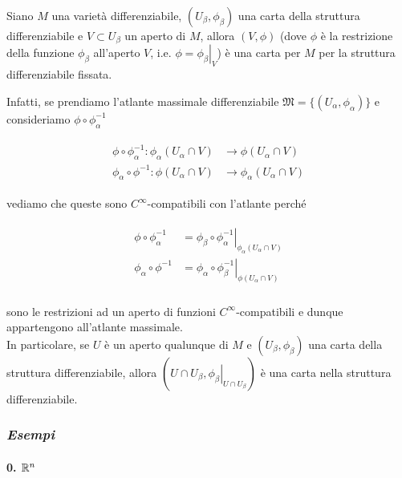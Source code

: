 \begin{remark}
	Siano $ M $ una varietà differenziabile, $ (U_{\beta},\phi_{\beta}) $ una carta della struttura differenziabile e $ V \subset U_{\beta} $ un aperto di $ M $, allora $ (V,\phi) $ (dove $ \phi $ è la restrizione della funzione $ \phi_{\beta} $ all'aperto $ V $, i.e. $ \phi = \left. \phi_{\beta} \right|_{V} $) è una carta per $ M $ per la struttura differenziabile fissata.
\end{remark}

Infatti, se prendiamo l'atlante massimale differenziabile $ \mathfrak{M} = \{(U_{\alpha},\phi_{\alpha})\} $ e consideriamo $ \phi \circ \phi_{\alpha}^{-1} $

\begin{align}
	\begin{split}
		\phi \circ \phi_{\alpha}^{-1} : \phi_{\alpha}(U_{\alpha} \cap V) &\to \phi(U_{\alpha} \cap V)\\
		\phi_{\alpha} \circ \phi^{-1} : \phi(U_{\alpha} \cap V) &\to \phi_{\alpha}(U_{\alpha} \cap V)
	\end{split}
\end{align}

vediamo che queste sono $ C^{\infty} $-compatibili con l'atlante perché

\begin{align}
	\begin{split}
		\phi \circ \phi_{\alpha}^{-1} &= \left. \phi_{\beta} \circ \phi_{\alpha}^{-1} \right|_{\phi_{\alpha}(U_{\alpha} \cap V)}\\
		\phi_{\alpha} \circ \phi^{-1} &= \left. \phi_{\alpha} \circ \phi_{\beta}^{-1} \right|_{\phi(U_{\alpha} \cap V)}\\
	\end{split}
\end{align}

sono le restrizioni ad un aperto di funzioni $ C^{\infty} $-compatibili e dunque appartengono all'atlante massimale.\\
In particolare, se $ U $ è un aperto qualunque di $ M $ e $ (U_{\beta},\phi_{\beta}) $ una carta della struttura differenziabile, allora $ (U \cap U_{\beta},\left. \phi_{\beta} \right|_{U \cap U_{\beta}}) $ è una carta nella struttura differenziabile.

\subsubsection{\textit{Esempi}}

\paragraph{0. $ \mathbb{R}^{n} $}

